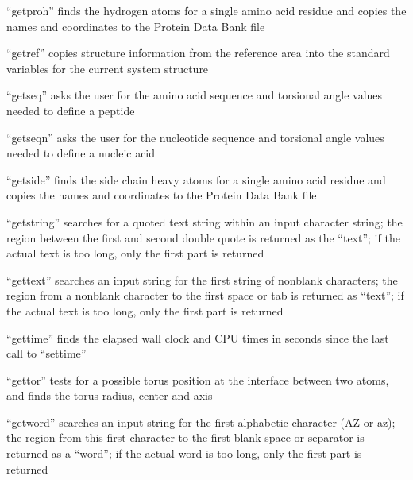 \documentclass[letterpaper,11pt,english]{sphinxmanual}
\begin{document}

“getproh” finds the hydrogen atoms for a single amino acid
residue and copies the names and coordinates to the Protein
Data Bank file


“getref” copies structure information from the reference area
into the standard variables for the current system structure


“getseq” asks the user for the amino acid sequence
and torsional angle values needed to define a peptide


“getseqn” asks the user for the nucleotide sequence and
torsional angle values needed to define a nucleic acid


“getside” finds the side chain heavy atoms for a single amino
acid residue and copies the names and coordinates to the Protein
Data Bank file


“getstring” searches for a quoted text string within an input
character string; the region between the first and second
double quote is returned as the “text”; if the actual text is
too long, only the first part is returned


“gettext” searches an input string for the first string of
non\sphinxhyphen{}blank characters; the region from a non\sphinxhyphen{}blank character
to the first space or tab is returned as “text”; if the
actual text is too long, only the first part is returned


“gettime” finds the elapsed wall clock and CPU times in seconds
since the last call to “settime”


“gettor” tests for a possible torus position at the interface
between two atoms, and finds the torus radius, center and axis


“getword” searches an input string for the first alphabetic
character (A\sphinxhyphen{}Z or a\sphinxhyphen{}z); the region from this first character
to the first blank space or separator is returned as a “word”;
if the actual word is too long, only the first part is returned
\end{document}
